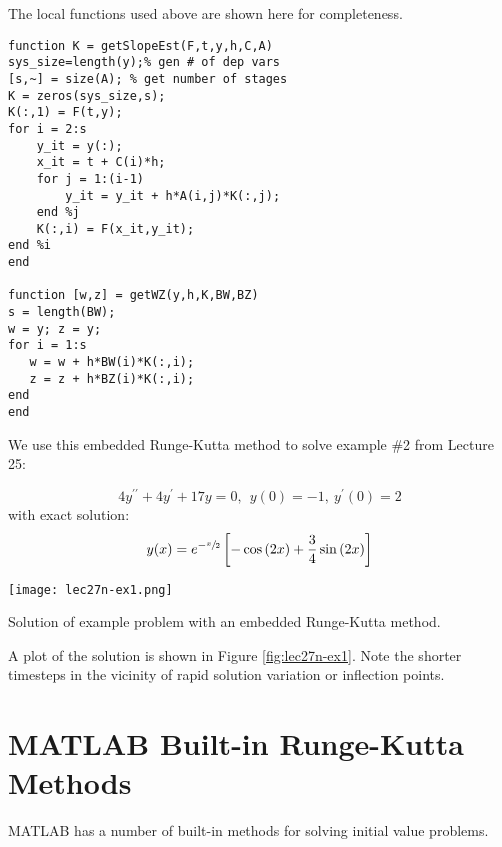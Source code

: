 The local functions used above are shown here for completeness.
\begin{lstlisting}[style=myMatlab,name=lec27n-1]
function K = getSlopeEst(F,t,y,h,C,A)
sys_size=length(y);% gen # of dep vars
[s,~] = size(A); % get number of stages
K = zeros(sys_size,s);
K(:,1) = F(t,y);
for i = 2:s
    y_it = y(:);
    x_it = t + C(i)*h;
    for j = 1:(i-1)
        y_it = y_it + h*A(i,j)*K(:,j);
    end %j    
    K(:,i) = F(x_it,y_it);
end %i
end

function [w,z] = getWZ(y,h,K,BW,BZ)
s = length(BW);
w = y; z = y;
for i = 1:s
   w = w + h*BW(i)*K(:,i);
   z = z + h*BZ(i)*K(:,i);
end
end
\end{lstlisting}
We use this embedded Runge-Kutta method to solve example \#2 from Lecture 25:

\begin{equation*}
4y^{\prime \prime}+4y^{\prime} + 17y=0, \ \ y(0)=-1, \ y^{\prime}(0)=2
\end{equation*}
with exact solution:
\begin{equation*}
y(x)=e^{-\sfrac{x}{2}}\left[-\cos{(2x)}+\frac{3}{4}\sin{(2x)} \right]
\end{equation*}
\begin{marginfigure}
\texttt{[image: lec27n-ex1.png]}
\caption{Solution of example problem with an embedded Runge-Kutta method.}
\label{fig:lec27n-ex1}
\end{marginfigure}
A plot of the solution is shown in Figure \ref{fig:lec27n-ex1}.  Note the shorter timesteps in the vicinity of rapid solution variation or inflection points.

\section{MATLAB Built-in Runge-Kutta Methods}

MATLAB has a number of built-in methods for solving initial value problems.  
